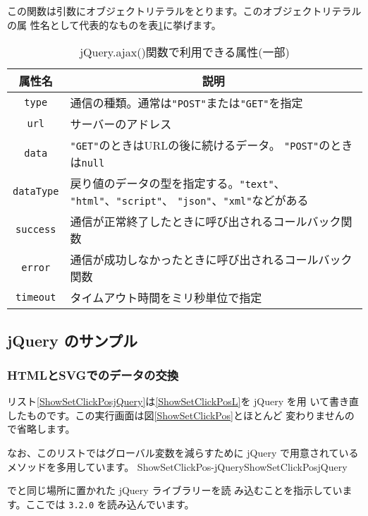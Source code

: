 この関数は引数にオブジェクトリテラルをとります。このオブジェクトリテラルの属
性名として代表的なものを表\ref{jQueryAjax}に挙げます。
\begin{table}[ht]
 \caption{jQuery.ajax()関数で利用できる属性(一部)}\label{jQueryAjax}
\begin{center}
 \begin{tabular}{|c|m{}|}\hline
属性名  &\multicolumn{1}{c|}{説明} \\\hline
  \texttt{type}&通信の種類。通常は\texttt{"POST"}または\texttt{"GET"}を指定\\
  \hline
  \texttt{url}&サーバーのアドレス\\ \hline
  \texttt{data}&\texttt{"GET"}のときはURLの後に続けるデータ。
      \texttt{"POST"}のときは\texttt{null}\\ \hline
  \texttt{dataType}&戻り値のデータの型を指定する。\texttt{"text"}、
      \texttt{"html"}、\texttt{"script"}、      
\texttt{"json"}、\texttt{"xml"}などがある\\ \hline
\texttt{success}&通信が正常終了したときに呼び出されるコールバック関数
      \\ \hline
\texttt{error}&通信が成功しなかったときに呼び出されるコールバック関数
      \\ \hline
  \texttt{timeout}&タイムアウト時間をミリ秒単位で指定\\ \hline
 \end{tabular}
\end{center}
\end{table}
\subsection{jQuery のサンプル}
\renewcommand{\FuncRef}[1]{{機能\ref{#1}}}
\subsubsection{HTMLとSVGでのデータの交換}
リスト\ref{ShowSetClickPosjQuery}は\ref{ShowSetClickPosL}を jQuery を用
いて書き直したものです。この実行画面は図\ref{ShowSetClickPos}とほとんど
変わりませんので省略します。

なお、このリストではグローバル変数を減らすために jQuery で用意されている
メソッドを多用しています。
{}%
{ShowSetClickPos-jQuery}{ShowSetClickPosjQuery}

で\HTML と同じ場所に置かれた jQuery ライブラリーを読
			 み込むことを指示しています。ここでは \texttt{3.2.0} を読み込んでいます。

